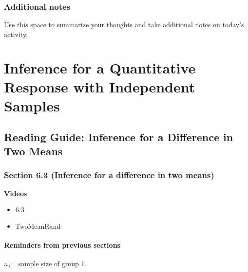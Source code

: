 \documentclass[
]{report}
\providecommand{\tightlist}{%
  \setlength{\itemsep}{0pt}\setlength{\parskip}{0pt}}
\begin{document}
\hypertarget{additional-notes-9}{%
\subsection{Additional notes}\label{additional-notes-9}}

Use this space to summarize your thoughts and take additional notes on today's activity.

\hypertarget{inference-for-a-quantitative-response-with-independent-samples}{%
\chapter{Inference for a Quantitative Response with Independent Samples}\label{inference-for-a-quantitative-response-with-independent-samples}}

\hypertarget{reading-guide-inference-for-a-difference-in-two-means}{%
\section{Reading Guide: Inference for a Difference in Two Means}\label{reading-guide-inference-for-a-difference-in-two-means}}

\hypertarget{section-6.3-inference-for-a-difference-in-two-means}{%
\subsection*{Section 6.3 (Inference for a difference in two means)}\label{section-6.3-inference-for-a-difference-in-two-means}}

\textbf{Videos}

\begin{itemize}
\tightlist
\item
  6.3
\item
  TwoMeanRand
\end{itemize}


\hypertarget{reminders-from-previous-sections-8}{%
\subsubsection*{Reminders from previous sections}\label{reminders-from-previous-sections-8}}

\(n_1\)= sample size of group 1
\end{document}
